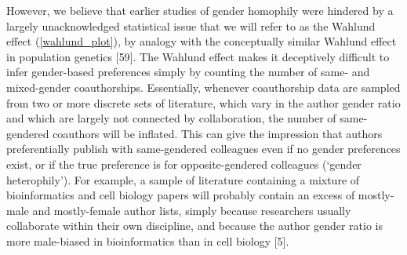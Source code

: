 \documentclass[12pt,]{article}
\begin{document}
However, we believe that earlier studies of gender homophily were
hindered by a largely unacknowledged statistical issue that we will
refer to as the Wahlund effect (\autoref{wahlund_plot}), by analogy with
the conceptually similar Wahlund effect in population genetics {[}59{]}.
The Wahlund effect makes it deceptively difficult to infer gender-based
preferences simply by counting the number of same- and mixed-gender
coauthorships. Essentially, whenever coauthorship data are sampled from
two or more discrete sets of literature, which vary in the author gender
ratio and which are largely not connected by collaboration, the number
of same-gendered coauthors will be inflated. This can give the
impression that authors preferentially publish with same-gendered
colleagues even if no gender preferences exist, or if the true
preference is for opposite-gendered colleagues (`gender heterophily').
For example, a sample of literature containing a mixture of
bioinformatics and cell biology papers will probably contain an excess
of mostly-male and mostly-female author lists, simply because
researchers usually collaborate within their own discipline, and because
the author gender ratio is more male-biased in bioinformatics than in
cell biology {[}5{]}.
\end{document}
